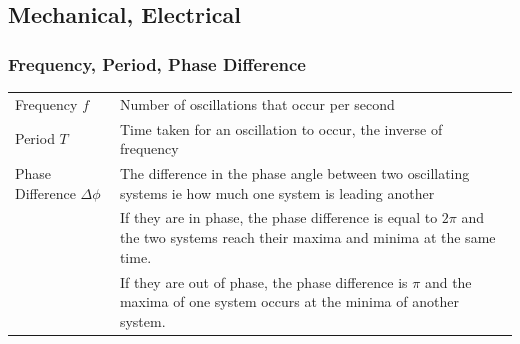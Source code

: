 \documentclass[11pt]{article}
\numberwithin{equation}{section}
\begin{document}
		\subsection{Mechanical, Electrical}
			\subsubsection{Frequency, Period, Phase Difference}
				\begin{center}
					\renewcommand{\arraystretch}{1.5}
					\begin{tabular}[h]{@{}l@{\hspace{2em}}p{10cm}@{}}
						\toprule
						Frequency $f$ & Number of oscillations that occur per second \\
						Period $T$ & Time taken for an oscillation to occur, the inverse of frequency \\
						Phase Difference $\Delta\phi$ & The difference in the phase angle between two oscillating systems ie how much one system is leading another \\
						& If they are in phase, the phase difference is equal to $2\pi$ and the two systems reach their maxima and minima at the same time. \\
						& If they are out of phase, the phase difference is $\pi$ and the maxima of one system occurs at the minima of another system. \\
						\bottomrule
					\end{tabular}
				\end{center}
\end{document}
